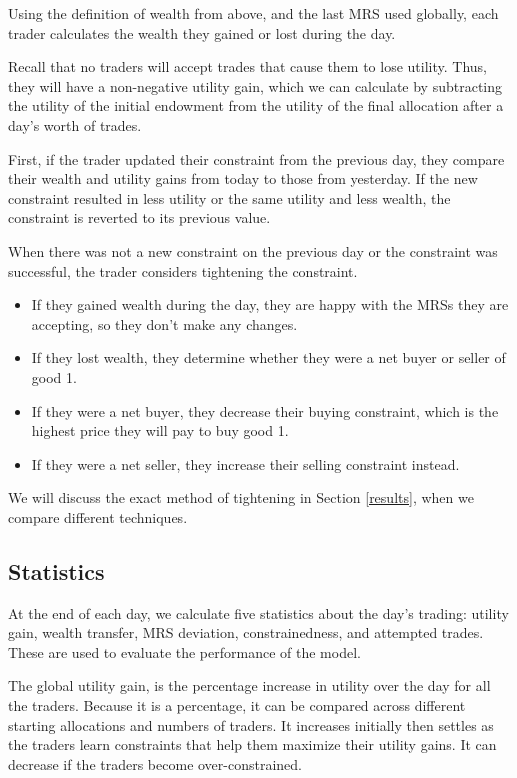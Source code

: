 \documentclass[12pt,a4paper,titlepage]{article}
\begin{document}
Using the definition of wealth from above, and the last MRS used globally, each trader calculates the wealth they gained or lost during the day.

Recall that no traders will accept trades that cause them to lose utility. 
Thus, they will have a non-negative utility gain, which we can calculate by subtracting the utility of the initial endowment from the utility of the final allocation after a day's worth of trades.

First, if the trader updated their constraint from the previous day, they compare their wealth and utility gains from today to those from yesterday.
If the new constraint resulted in less utility or the same utility and less wealth, the constraint is reverted to its previous value.

When there was not a new constraint on the previous day or the constraint was successful, the trader considers tightening the constraint.
\begin{itemize}
  \item If they gained wealth during the day, they are happy with the MRSs they are accepting, so they don't make any changes.
  \item If they lost wealth, they determine whether they were a net buyer or seller of good 1.
  \item If they were a net buyer, they decrease their buying constraint, which is the highest price they will pay to buy good 1.
  \item If they were a net seller, they increase their selling constraint instead.
\end{itemize}
We will discuss the exact method of tightening in Section \ref{results}, when we compare different techniques.

\subsection{Statistics}
At the end of each day, we calculate five statistics about the day's trading: utility gain, wealth transfer, MRS deviation, constrainedness, and attempted trades.
These are used to evaluate the performance of the model.

The global utility gain, is the percentage increase in utility over the day for all the traders. 
Because it is a percentage, it can be compared across different starting allocations and numbers of traders.
It increases initially then settles as the traders learn constraints that help them maximize their utility gains.
It can decrease if the traders become over-constrained.
\end{document}
